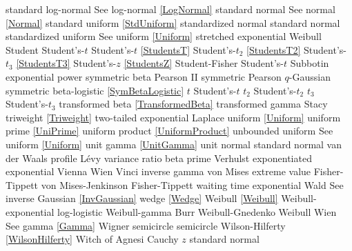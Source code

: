 standard log-normal				\dotfill	See log-normal \eqref{LogNormal} 	\ncite	%
standard normal 				\dotfill	See normal \eqref{Normal} 			\ncite	%
standard uniform				\dotfill	\eqref{StdUniform}					\ncite	%
standardized normal 			\dotfill	standard normal					\ncite	%
standardized uniform 			\dotfill	See uniform \eqref{Uniform}			\ncite	%
stretched exponential 			\dotfill	Weibull 								
Student							\dotfill 	Student's-$t$						\ncite	%
Student's-$t$					\dotfill	\eqref{StudentsT}  					\ncite	%
Student's-$t_2$					\dotfill	\eqref{StudentsT2}  					\ncite	%
Student's-$t_3$					\dotfill	\eqref{StudentsT3}  					\ncite	
Student's-$z$					\dotfill	\eqref{StudentsZ}					\ncite	%
Student-Fisher					\dotfill	Student's-$t$							%
Subbotin						\dotfill	exponential power					\ncite
symmetric beta					\dotfill	Pearson II							\ncite	%
symmetric Pearson				\dotfill	$q$-Gaussian						\mcite{\self}		%
symmetric beta-logistic			\dotfill	\eqref{SymBetaLogistic}				\mcite{\self}
%
$t$								\dotfill	Student's-$t$ 						\ncite	%
$t_2$							\dotfill	Student's-$t_2$ 					\ncite	%
$t_3$							\dotfill	Student's-$t_3$ 					\ncite
transformed beta				\dotfill	\eqref{TransformedBeta} 				\ncite	%
transformed gamma				\dotfill	Stacy 							\ncite %
triweight						\dotfill	\eqref{Triweight}						\ncite
two-tailed exponential			\dotfill	Laplace							\ncite %
%
uniform  						\dotfill	\eqref{Uniform}						\ncite 	%
uniform prime					\dotfill	\eqref{UniPrime}					\ncite	%
uniform product 				\dotfill	\eqref{UniformProduct}				\ncite 	%
%
unbounded uniform 				\dotfill	See uniform \eqref{Uniform}			\ncite	%
unit gamma						\dotfill	\eqref{UnitGamma} 					\ncite	%
unit normal						\dotfill	standard normal 					\ncite	%
%
van der Waals profile 			\dotfill	L\'{e}vy 							\ncite	%
variance ratio					\dotfill	beta prime 						\ncite	%
Verhulst						\dotfill	exponentiated exponential					 
Vienna 							\dotfill	Wien 							\ncite	%
Vinci 							\dotfill	inverse gamma 					\ncite	%
von Mises extreme value			\dotfill	Fisher-Tippett 						\ncite	%
von Mises-Jenkinson 			\dotfill	Fisher-Tippett 						\ncite	%
%
waiting time					\dotfill	exponential 						\ncite	%
Wald							\dotfill	See inverse Gaussian	 \eqref{InvGaussian}				\ncite	%
wedge							\dotfill	\eqref{Wedge}  						\ncite	%
Weibull 						\dotfill	\eqref{Weibull} 						\ncite	%
Weibull-exponential 			\dotfill	log-logistic 						\ncite	%
Weibull-gamma					\dotfill	Burr								\ncite	%
Weibull-Gnedenko				\dotfill	Weibull 							\ncite	%
Wien							\dotfill	See gamma \eqref{Gamma}			\ncite	%
Wigner semicircle				\dotfill	semicircle 						\ncite	%
Wilson-Hilferty					\dotfill	\eqref{WilsonHilferty} 				\ncite	%
Witch of Agnesi					\dotfill	Cauchy								%
%	
$z$								\dotfill	standard normal 					\ncite	%



\clearpage

